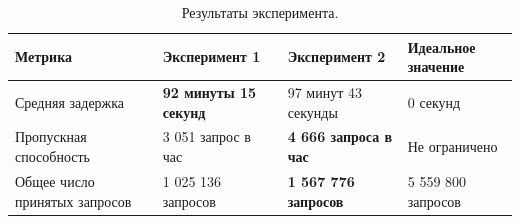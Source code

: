 \documentclass[draft]{article}
\begin{document}
\begin{table}[h]
\begin{center}
\begin{tabular}{ | l | l | l | l | }
\hline
Метрика & Эксперимент 1 & Эксперимент 2 & Идеальное значение\\ \hline
Средняя задержка & \textbf{92 минуты 15 секунд} & 97 минут 43 секунды & 0 секунд \\
Пропускная способность & 3 051 запрос в час & \textbf{4 666 запроса в час} & Не ограничено \\
Общее число принятых запросов & 1 025 136 запросов & \textbf{1 567 776 запросов} & 5 559 800 запросов \\
\hline
\end{tabular}
\caption{\label{tab:table-name}Результаты эксперимента.}
\end{center}
\end{table}
\end{document}
